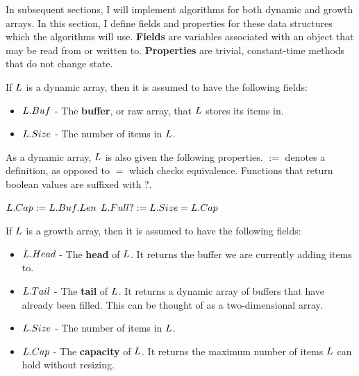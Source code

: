 In subsequent sections, I will implement algorithms for both dynamic and growth arrays. In this section, I define fields and properties for these data structures which the algorithms will use. \textbf{Fields} are variables associated with an object that may be read from or written to. \textbf{Properties} are trivial, constant-time methods that do not change state.

If $L$ is a dynamic array, then it is assumed to have the following fields:

\begin{itemize}
	\item $L.Buf$ - The \textbf{buffer}, or raw array, that $L$ stores its items in.
	\item $L.Size$ - The number of items in $L$.
\end{itemize}

As a dynamic array, $L$ is also given the following properties. $:=$ denotes a definition, as opposed to $=$ which checks equivalence. Functions that return boolean values are suffixed with ?.

\begin{algorithm}
	\begin{algorithmic}
		\State $L.Cap := L.Buf.Len$
		\State
		\State $L.Full? := L.Size = L.Cap$
	\end{algorithmic}
\end{algorithm}

If $L$ is a growth array, then it is assumed to have the following fields:

\begin{itemize}
	\item $L.Head$ - The \textbf{head} of $L$. It returns the buffer we are currently adding items to.
	\item $L.Tail$ - The \textbf{tail} of $L$. It returns a dynamic array of buffers that have already been filled. This can be thought of as a two-dimensional array.
	\item $L.Size$ - The number of items in $L$.
	\item $L.Cap$ - The \textbf{capacity} of $L$. It returns the maximum number of items $L$ can hold without resizing.
\end{itemize}

